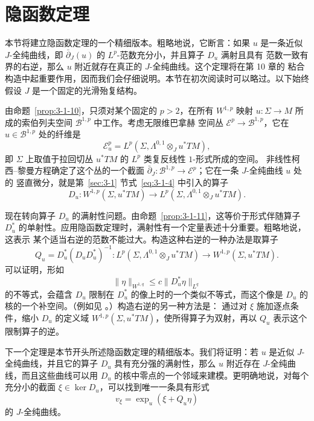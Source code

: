 
\section{隐函数定理}\label{sec:3-5}

本节将建立隐函数定理的一个精细版本。粗略地说，它断言：如果 $u$ 是一条近似
$J$-全纯曲线，即 $\bar\partial_J(u)$ 的 $L^p$-范数充分小，并且算子 $D_u$ 满射且具有
范数一致有界的右逆，那么 $u$ 附近就存在真正的 $J$-全纯曲线。这个定理将在第 10 章的
粘合构造中起重要作用，因而我们会仔细说明。本节在初次阅读时可以略过。以下始终假设
$J$ 是一个固定的光滑殆复结构。

由命题~\ref{prop:3-1-10}，只须对某个固定的 $p>2$，在所有 $W^{1,p}$ 映射
$u:\Sigma\to M$ 所成的索伯列夫空间 $\mathcal B^{1,p}$ 中工作。考虑无限维巴拿赫
空间丛 $\mathcal E^p\to\mathcal B^{1,p}$，它在 $u\in\mathcal B^{1,p}$ 处的纤维是
\[
  \mathcal E_u^p
  =L^p(\Sigma,\Lambda^{0,1}\otimes_Ju^*TM),
\]
即 $\Sigma$ 上取值于拉回切丛 $u^*TM$ 的 $L^p$ 类复反线性 $1$-形式所成的空间。
非线性柯西--黎曼方程确定了这个丛的一个截面
$\bar\partial_J:\mathcal B^{1,p}\to\mathcal E^p$；它在一条 $J$-全纯曲线 $u$ 处的
竖直微分，就是第~\ref{sec:3-1} 节式~\eqref{eq:3-1-4} 中引入的算子
\[
  D_u:W^{1,p}(\Sigma,u^*TM)
  \longrightarrow L^p(\Sigma,\Lambda^{0,1}\otimes_Ju^*TM).
\]

现在转向算子 $D_u$ 的满射性问题。由命题~\ref{prop:3-1-11}，这等价于形式伴随算子
$D_u^*$ 的单射性。应用隐函数定理时，满射性有一个定量表述十分重要。粗略地说，这表示
某个适当右逆的范数不能过大。构造这种右逆的一种办法是取算子
\[
  Q_u=D_u^*(D_uD_u^*)^{-1}:
  L^p(\Sigma,\Lambda^{0,1}\otimes_Ju^*TM)
  \longrightarrow W^{1,p}(\Sigma,u^*TM).
\]
可以证明，形如
\[
  \lVert\eta\rVert_{W^{1,q}}
  \le c\lVert D_u^*\eta\rVert_{L^q}
\]
的不等式，会蕴含 $D_u$ 限制在 $D_u^*$ 的像上时的一个类似不等式，而这个像是
$D_u$ 的核的一个补空间。（例如见 。）构造右逆的另一种方法是：
通过对 $\xi$ 施加逐点条件，缩小 $D_u$ 的定义域
$W^{1,p}(\Sigma,u^*TM)$，使所得算子为双射，再以 $Q_u$ 表示这个限制算子的逆。

下一个定理是本节开头所述隐函数定理的精细版本。我们将证明：若 $u$ 是近似
$J$-全纯曲线，并且它的算子 $D_u$ 具有充分强的满射性，那么 $u$ 附近存在
$J$-全纯曲线，而且这些曲线可以用 $D_u$ 的核中零点的一个邻域来建模。更明确地说，对每个
充分小的截面 $\xi\in\ker D_u$，可以找到唯一一条具有形式
\[
  v_\xi=\exp_u(\xi+Q_u\eta)
\]
的 $J$-全纯曲线。

